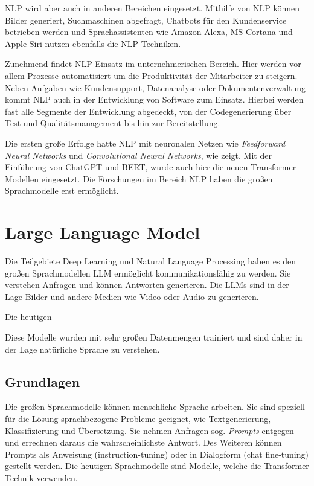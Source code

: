 NLP wird aber auch in anderen Bereichen eingesetzt. Mithilfe von NLP können Bilder generiert, Suchmaschinen abgefragt, Chatbots für den Kundenservice betrieben werden und Sprachassistenten wie Amazon Alexa, MS Cortana und Apple Siri nutzen ebenfalls die NLP Techniken.\vspace{0.2cm}

Zunehmend findet NLP Einsatz im unternehmerischen Bereich. Hier werden vor allem Prozesse automatisiert um die Produktivität der Mitarbeiter zu steigern. Neben Aufgaben wie Kundensupport, Datenanalyse oder Dokumentenverwaltung kommt NLP auch in der Entwicklung von Software zum Einsatz. Hierbei werden fast alle Segmente der Entwicklung abgedeckt, von der Codegenerierung über Test und Qualitätsmanagement bis hin zur Bereitstellung.\vspace{0.2cm}

Die ersten große Erfolge hatte NLP mit neuronalen Netzen wie \textit{Feedforward Neural Networks} und \textit{Convolutional Neural Networks}, wie \cite{goldberg-2016} zeigt. Mit der Einführung von ChatGPT und BERT, wurde auch hier die neuen Transformer Modellen eingesetzt. Die Forschungen im Bereich NLP haben die großen Sprachmodelle erst ermöglicht.


\section{Large Language Model}
Die Teilgebiete Deep Learning und Natural Language Processing haben es den großen Sprachmodellen \acrshort{LLM} ermöglicht kommunikationsfähig zu werden. Sie verstehen Anfragen und können Antworten generieren. Die LLMs sind in der Lage Bilder und andere Medien wie Video oder Audio zu generieren.\vspace{0.2cm}

Die heutigen 

Diese Modelle wurden mit sehr großen Datenmengen trainiert und sind daher in der Lage natürliche Sprache zu verstehen.

\subsection{Grundlagen}

Die großen Sprachmodelle können menschliche Sprache arbeiten. Sie sind speziell für die Lösung  sprachbezogene Probleme geeignet, wie Textgenerierung, Klassifizierung und Übersetzung. Sie nehmen Anfragen sog. \textit{Prompts} entgegen und errechnen daraus die wahrscheinlichste Antwort. Des Weiteren können Prompts als Anweisung (instruction-tuning) oder in Dialogform (chat fine-tuning) gestellt werden. Die heutigen Sprachmodelle sind Modelle, welche die Transformer Technik verwenden.

